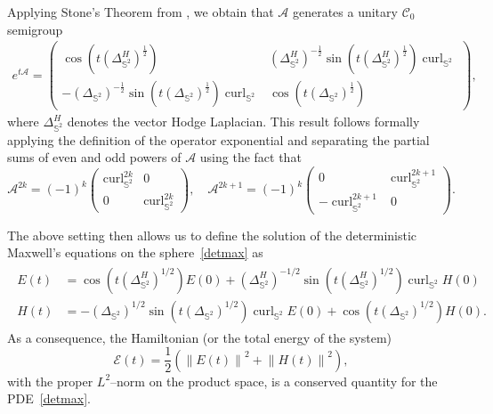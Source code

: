 \documentclass[11pt]{amsart}
\newcommand{\IS}{\mathbb{S}}
\providecommand{\norm}[1]{\left\lVert#1\right\rVert}
\newcommand{\Deltalb}{\Delta_{\IS^2}}
\begin{document}
Applying Stone's Theorem from \cite{Stone}, we obtain that $\mathcal A$ generates a unitary $\mathcal{C}_0$ semigroup
\begin{align}\label{ME_semi}
	e^{t\mathcal{A}}=\begin{pmatrix}
		\cos(t(\Delta^{H}_{\IS^2})^{\frac12}) & 
		(\Delta^{H}_{\IS^2})^{-\frac12}\sin(t(\Delta^{H}_{\IS^2})^{\frac12})\operatorname{curl}_{\IS^2}\\
		-(\Delta_{\IS^2})^{-\frac12}\sin(t(\Delta_{\IS^2})^{\frac12})\operatorname{curl}_{\IS^2} & 
		\cos(t(\Delta_{\IS^2})^{\frac12})
	\end{pmatrix},
\end{align}
where $\Delta^H_{\IS^2}$ denotes the vector Hodge Laplacian.
This result follows formally applying the definition of the operator exponential and separating the partial sums of even and odd powers of $\mathcal{A}$ using the fact that
$$
\mathcal{A}^{2k}=(-1)^k
\begin{pmatrix} 
	\operatorname{curl}_{\IS^2}^{2k} & 0\\ 
	0 & \operatorname{curl}_{\IS^2}^{2k}
\end{pmatrix},\quad 
\mathcal{A}^{2k+1}=(-1)^k
\begin{pmatrix} 0 & \operatorname{curl}_{\IS^2}^{2k+1}\\ -\operatorname{curl}_{\IS^2}^{2k+1} & 0
\end{pmatrix}.
$$ 

The above setting then allows us to define the solution of the deterministic Maxwell's equations on the sphere~\eqref{detmax} as
\begin{align}
	\label{eqn:ME}
	\begin{split}
	E(t)&=\cos(t(\Deltalb^H)^{1/2})E(0)+(\Deltalb^H)^{-1/2}\sin(t(\Deltalb^H)^{1/2})\operatorname{curl}_{\IS^2} H(0)\\
	H(t)&=-(\Deltalb)^{1/2}\sin(t(\Deltalb)^{1/2})\operatorname{curl}_{\IS^2} E(0)+\cos(t(\Deltalb)^{1/2})H(0).
	\end{split}
\end{align}
As a consequence, the Hamiltonian (or the total energy of the system)
\begin{equation}\label{sme-energy}
	\mathcal{E}(t)=\frac12\left(\norm{E(t)}^2+\norm{H(t)}^2\right),
\end{equation}
with the proper $L^2$--norm on the product space, is a conserved quantity for the PDE~\eqref{detmax}.
\end{document}
